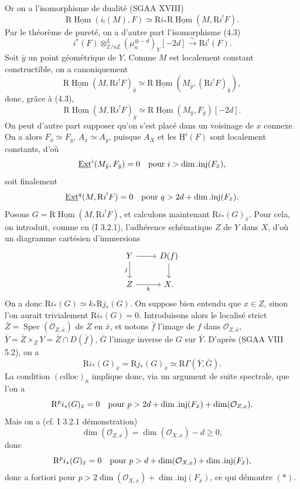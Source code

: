 \documentclass[11pt]{article}
\providecommand{\uH}{\underline{\mathrm H}}
\DeclareMathOperator{\Hom}{Hom}
\DeclareMathOperator{\Ext}{Ext}
\DeclareMathOperator{\Spec}{Spec}
\newcommand{\R}{\mathrm{R}}\newcommand{\RHomCore}{\mathrm{RHom}}
\newcommand{\Z}{\mathbb{Z}}
\providecommand{\Hom}{\operatorname{Hom}}
\providecommand{\R}{\mathrm R}
\providecommand{\Z}{\mathbb Z}
\providecommand{\Spec}{\operatorname{Spec}}
\providecommand{\Spec}{\operatorname{Spec}}
\providecommand{\Hom}{\operatorname{Hom}}
\providecommand{\Spec}{\operatorname{Spec}}
\providecommand{\Spec}{\operatorname{Spec}}
\begin{document}
Or on a l'isomorphisme de dualité (SGAA XVIII)
\[
        \R\underline{\Hom}(i_!(M),F)\simeq \R i_*\R\underline{\Hom}(M,\R i^!F).
\]
Par le théorème de pureté, on a d'autre part l'isomorphisme (4.3)
\[
        i^*(F)\otimes^L_{\Z/n\Z}(\mu_n^{\otimes -d})_Y[-2d]\xrightarrow{\sim}\R i^!(F).
\]
Soit $\bar{y}$ un point géométrique de $Y$. Comme $M$ est localement constant constructible, on a canoniquement
\[
        \R\underline{\Hom}(M,\R i^!F)_{\bar{y}}\simeq \R\underline{\Hom}(M_{\bar{y}},(\R i^!F)_{\bar{y}}),
\]
donc, grâce à (4.3),
\[
        \R\underline{\Hom}(M,\R i^!F)_{\bar{y}}\simeq \R\underline{\Hom}(M_{\bar{y}},F_{\bar{y}})[-2d].
\]
On peut d'autre part supposer qu'on s'est placé dans un voisinage de $x$ connexe. On a alors $F_{\bar{x}}\simeq F_{\bar{y}}$, $A_{\bar{x}}\simeq A_{\bar{y}}$, puisque $A_X$ et les $\uH^i(F)$ sont localement constants, d'où
\[
        \underline{\Ext}^i(M_{\bar{y}},F_{\bar{y}})=0\quad\hbox{pour }i>\dim.\mathrm{inj}(F_{\bar{x}}),
\]
soit finalement
\[
        \underline{\Ext}^{q}(M,\R i^!F)=0\quad\hbox{pour }q>2d+\dim.\mathrm{inj}(F_{\bar{x}}).
\]
Posons $G=\R\underline{\Hom}(M,\R i^!F)$, et calculons maintenant $\R i_*(G)_{\bar{x}}$. Pour cela, on introduit, comme en (I 3.2.1), l'adhérence schématique $Z$ de $Y$ dans $X$, d'où un diagramme cartésien d'immersions
\[
\begin{tikzcd}
Y \arrow[r] \arrow[d,"j"'] & D(f) \arrow[d]\\
Z \arrow[r,"k"'] & X.
\end{tikzcd}
\]
On a donc $\R i_*(G)\simeq k_*\R j_*(G)$. On suppose bien entendu que $x\in Z$, sinon l'on aurait trivialement $\R i_*(G)=0$. Introduisons alors le localisé strict $\bar{Z}=\Spec(\mathcal{O}_{Z,\bar{x}})$ de $Z$ en $\bar{x}$, et notons $\bar{f}$ l'image de $f$ dans $\mathcal{O}_{Z,\bar{x}}$, $\bar{Y}=\bar{Z}\times_ZY=\bar{Z}\cap D(\bar{f})$, $\bar{G}$ l'image inverse de $G$ sur $\bar{Y}$. D'après (SGAA VIII 5.2), on a
\[
        \R i_*(G)_{\bar{x}}=\R j_*(G)_{\bar{x}}\simeq \R\Gamma(\bar{Y},\bar{G}).
\]
La condition $(\mathrm{cdloc})_n$ implique donc, via un argument de suite spectrale, que l'on a
\[
        \R^p i_*(G)_{\bar{x}}=0\quad\hbox{pour }p>2d+\dim.\mathrm{inj}(F_{\bar{x}})+\dim(\mathcal{O}_{Z,x}).
\]
Mais on a (cf. I 3.2.1 démonstration)
\[
        \dim(\mathcal{O}_{Z,x})=\dim(\mathcal{O}_{X,x})-d\geq0,
\]
donc
\[
        \R^p i_*(G)_{\bar{x}}=0\quad\hbox{pour }p>d+\dim(\mathcal{O}_{X,x})+\dim.\mathrm{inj}(F_{\bar{x}}),
\]
donc a fortiori pour $p>2\dim(\mathcal{O}_{X,x})+\dim.\mathrm{inj}(F_{\bar{x}})$, ce qui démontre $(*)$.
\end{document}
